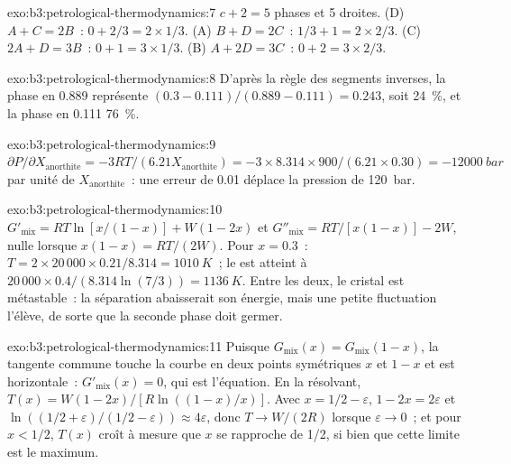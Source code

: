 \begin{solution}{exo:b3:petrological-thermodynamics:7}
$c + 2 = 5$ phases et 5 droites. (D) $A + C = 2B$~: $0 + 2/3 = 2\times1/3$. (A)
$B + D = 2C$~: $1/3 + 1 = 2\times2/3$. (C) $2A + D = 3B$~: $0 + 1 = 3\times1/3$.
(B) $A + 2D = 3C$~: $0 + 2 = 3\times2/3$.
\end{solution}

\begin{solution}{exo:b3:petrological-thermodynamics:8}
D'après la règle des segments inverses, la phase en 0.889 représente $(0.3 - 0.111)/(0.889 - 0.111) =
0.243$, soit \qty{24}{\percent}, et la phase en 0.111 \qty{76}{\percent}.
\end{solution}

\begin{solution}{exo:b3:petrological-thermodynamics:9}
$\partial P/\partial X_{\text{anorthite}} = -3RT/(6.21X_{\text{anorthite}}) =
-3\times8.314\times900/(6.21\times0.30) = \qty{-12000}{bar}$ par unité de
$X_{\text{anorthite}}$~: une erreur de 0.01 déplace la pression de \qty{120}{bar}.
\end{solution}

\begin{solution}{exo:b3:petrological-thermodynamics:10}
$G'_{\text{mix}} = RT\ln[x/(1 - x)] + W(1 - 2x)$ et $G''_{\text{mix}} =
RT/[x(1 - x)] - 2W$, nulle lorsque $x(1 - x) = RT/(2W)$. Pour $x = 0.3$~: $T =
2\times20\,000\times0.21/8.314 = \qty{1010}{K}$~; le  est atteint à
$20\,000\times0.4/(8.314\ln(7/3)) = \qty{1136}{K}$. Entre les deux, le
cristal est métastable~: la séparation abaisserait son énergie, mais une
petite fluctuation l'élève, de sorte que la seconde phase doit germer.
\end{solution}

\begin{solution}{exo:b3:petrological-thermodynamics:11}
Puisque $G_{\text{mix}}(x) = G_{\text{mix}}(1 - x)$, la tangente commune touche
la courbe en deux points symétriques $x$ et $1 - x$ et est horizontale~:
$G'_{\text{mix}}(x) = 0$, qui est l'équation. En la résolvant, $T(x) = W(1 -
2x)/[R\ln((1 - x)/x)]$. Avec $x = 1/2 - \varepsilon$, $1 - 2x = 2\varepsilon$
et $\ln((1/2 + \varepsilon)/(1/2 - \varepsilon)) \approx 4\varepsilon$, donc
$T \to W/(2R)$ lorsque $\varepsilon \to 0$~; et pour $x < 1/2$, $T(x)$ croît
à mesure que $x$ se rapproche de 1/2, si bien que cette limite est le maximum.
\end{solution}

